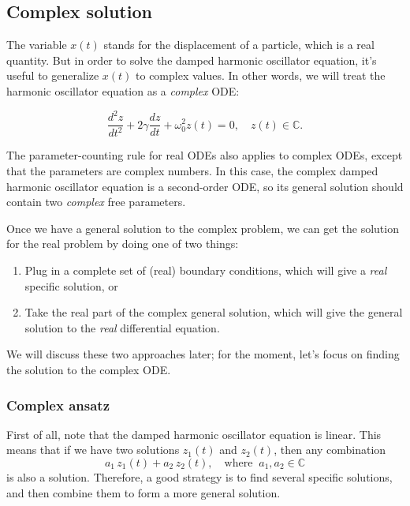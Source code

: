 \documentclass[10pt,a4paper]{article}
\begin{document}
\subsection{Complex solution}\label{complex-solution}

The variable $x(t)$ stands for the displacement of a particle, which
is a real quantity. But in order to solve the damped harmonic oscillator
equation, it's useful to generalize $x(t)$ to complex values. In other
words, we will treat the harmonic oscillator equation as a
\emph{complex} ODE:

\begin{framed}
  \begin{equation}
    \frac{d^2 z}{dt^2} + 2\gamma \frac{dz}{dt} + \omega_0^2 z(t) = 0, \quad z(t) \in \mathbb{C}.
  \end{equation}
\end{framed}

The parameter-counting rule for real ODEs also applies to complex
ODEs, except that the parameters are complex numbers. In this case,
the complex damped harmonic oscillator equation is a second-order ODE,
so its general solution should contain two \emph{complex} free
parameters.

Once we have a general solution to the complex problem, we can get the
solution for the real problem by doing one of two things:
\begin{enumerate}
\item
  Plug in a complete set of (real) boundary conditions, which will
  give a \emph{real} specific solution, or

\item
  Take the real part of the complex general solution, which will give
  the general solution to the \emph{real} differential equation.
\end{enumerate}
We will discuss these two approaches later; for the moment, let's focus
on finding the solution to the complex ODE.

\subsubsection{Complex ansatz}\label{complex-ansatz}

First of all, note that the damped harmonic oscillator equation is
linear. This means that if we have two solutions $z_1(t)$ and
$z_2(t)$, then any combination
\begin{equation}
a_1 \, z_1(t) + a_2 \,z_2(t),\quad \mathrm{where}\;\; a_1, a_2 \in \mathbb{C}
\end{equation}
is also a solution. Therefore, a good strategy is to find several
specific solutions, and then combine them to form a more general
solution.
\end{document}
